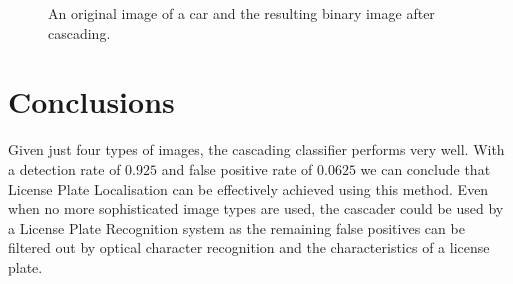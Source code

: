 \documentclass[a4paper,11pt]{article}
\begin{document}
\begin{figure}[!ht]
\centering
{}
\caption{An original image of a car and the resulting binary image after cascading.}
\label{fig:result}
\end{figure}

\section{Conclusions} \label{sec:conc}
Given just four types of images, the cascading classifier performs very well.
With a detection rate of $0.925$ and false positive rate of $0.0625$ we can
conclude that License Plate Localisation can be effectively achieved using this
method. Even when no more sophisticated image types are used, the cascader
could be used by a License Plate Recognition system as the remaining false
positives can be filtered out by optical character recognition and the
characteristics of a license plate.
\newpage
\renewcommand\bibname{References}


\end{document}
